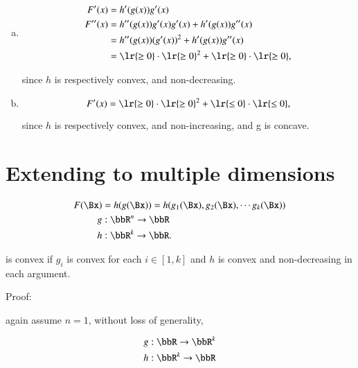 \begin{enumerate}[(a)]
\item
\begin{equation}\label{eqn:convexOptimizationLecture8:180}
\begin{aligned}
F'(x) &= h'(g(x)) g'(x) \\
F''(x) &=
h''(g(x)) g'(x) g'(x)
+
h'(g(x)) g''(x) \\
&=
h''(g(x)) (g'(x))^2
+
h'(g(x)) g''(x) \\
&= 
\lr{ \ge 0 } \cdot \lr{ \ge 0 }^2 + \lr{ \ge 0 } \cdot \lr{ \ge 0 },
\end{aligned}
\end{equation}

since \( h \) is respectively convex, and non-decreasing.
\item

\begin{equation}\label{eqn:convexOptimizationLecture8:180b}
F'(x) = 
\lr{ \ge 0 } \cdot \lr{ \ge 0 }^2 + \lr{ \le 0 } \cdot \lr{ \le 0 },
\end{equation}

since \( h \) is respectively convex, and non-increasing, and g is concave.
\end{enumerate}

\section{Extending to multiple dimensions}

\begin{equation}\label{eqn:convexOptimizationLecture8:200}
\begin{aligned}
F(\Bx)
&= h(g(\Bx))
= h( g_1(\Bx), g_2(\Bx), \cdots g_k(\Bx) ) \\
g &: \bbR^n \rightarrow \bbR \\
h &: \bbR^k \rightarrow \bbR.
\end{aligned}
\end{equation}

is convex if \( g_i \) is convex for each \( i \in [1,k] \) and \( h \) is convex and non-decreasing in each argument.

Proof:

again assume \( n = 1 \), without loss of generality,

\begin{equation}\label{eqn:convexOptimizationLecture8:220}
\begin{aligned}
g &: \bbR \rightarrow \bbR^k \\
h &: \bbR^k \rightarrow \bbR \\
\end{aligned}
\end{equation}


